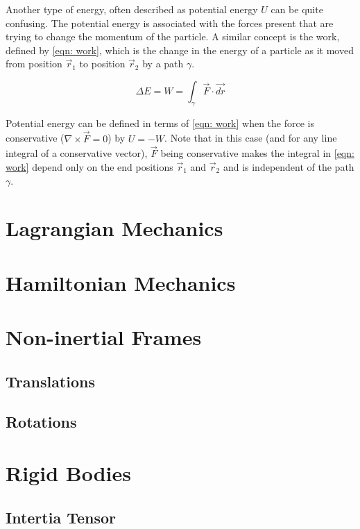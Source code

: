 \documentclass[main.tex]{subfiles}
\begin{document}
Another type of energy, often described as potential energy $U$ can be quite confusing.
The potential energy is associated with the forces present that are trying to change the
momentum of the particle. A similar concept is the work, defined by \cref{eqn: work},
which is the change in the energy of a particle as it moved from position $\vec{r}_1$ to
position $\vec{r}_2$ by a path $\gamma$.


\begin{equation} \label{eqn: work}
\Delta E = W = \int_{\gamma} \vec{F} \cdot \vec{dr}
\end{equation}

Potential energy can be defined in terms of \cref{eqn: work} when the force is
conservative ($\nabla \times \vec{F} = 0$) by $U = -W$. Note that in this case
(and for any line integral of a conservative vector), $\vec{F}$ being conservative makes
the integral in \cref{eqn: work} depend only on the end positions $\vec{r}_1$ and
$\vec{r}_2$ and is independent of the path $\gamma$.



\chapter{Lagrangian Mechanics}

\chapter{Hamiltonian Mechanics}

\chapter{Non-inertial Frames}

\section{Translations}

\section{Rotations}

\chapter{Rigid Bodies}

\section{Intertia Tensor}
\end{document}
